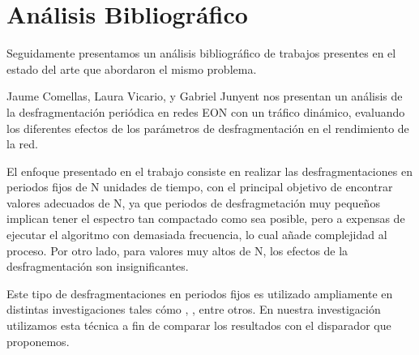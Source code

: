 \section{Análisis Bibliográfico}     




Seguidamente presentamos un análisis bibliográfico de trabajos presentes en el estado del arte que abordaron el mismo problema.

Jaume Comellas, Laura Vicario, y Gabriel Junyent \cite{comellas2018periodic} nos presentan un análisis de la desfragmentación periódica en redes EON con un tráfico dinámico, evaluando los diferentes efectos de los parámetros de desfragmentación en el rendimiento de la red.

El enfoque presentado en el trabajo consiste en realizar las desfragmentaciones en periodos fijos de N unidades de tiempo, con el principal objetivo de encontrar valores adecuados de N, ya que periodos de desfragmetación muy pequeños implican tener el espectro tan compactado como sea posible, pero a expensas de ejecutar el algoritmo con demasiada frecuencia, lo cual añade complejidad al proceso. Por otro lado, para valores muy altos de N, los efectos de la desfragmentación son insignificantes.

Este tipo de desfragmentaciones en periodos fijos es utilizado ampliamente en distintas investigaciones tales cómo \cite{davalos2019spectrum}, \cite{luo2012partial}, entre otros. En nuestra investigación utilizamos esta técnica a fin de comparar los resultados con el disparador que proponemos.

